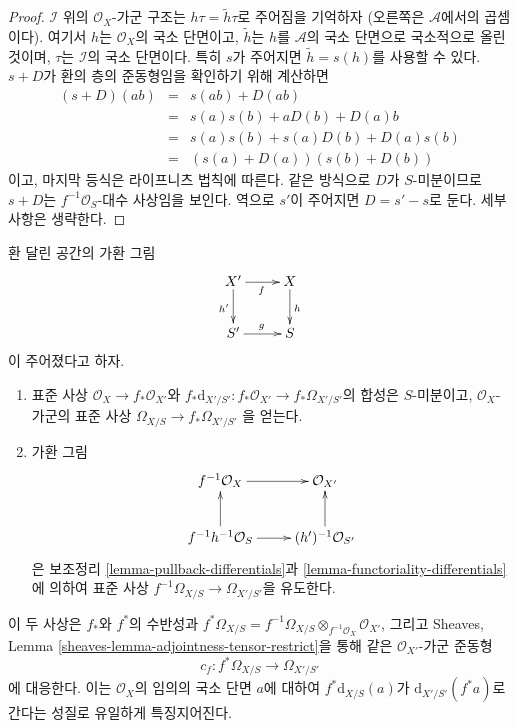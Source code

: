 \begin{proof}
$\mathcal{I}$ 위의 $\mathcal{O}_X$-가군 구조는
$h \tau = \tilde h \tau$로 주어짐을 기억하자
(오른쪽은 $\mathcal{A}$에서의 곱셈이다).
여기서 $h$는 $\mathcal{O}_X$의 국소 단면이고,
$\tilde h$는 $h$를 $\mathcal{A}$의 국소 단면으로 국소적으로
올린 것이며, $\tau$는 $\mathcal{I}$의 국소 단면이다.
특히 $s$가 주어지면 $\tilde h = s(h)$를 사용할 수 있다.
$s + D$가 환의 층의 준동형임을 확인하기 위해 계산하면
\begin{eqnarray*}
(s + D)(ab) & = & s(ab) + D(ab) \\
& = & s(a)s(b) + aD(b) + D(a)b \\
& = & s(a) s(b) + s(a)D(b) + D(a)s(b) \\
& = & (s(a) + D(a))(s(b) + D(b))
\end{eqnarray*}
이고, 마지막 등식은 라이프니츠 법칙에 따른다. 같은 방식으로
$D$가 $S$-미분이므로 $s + D$는 $f^{-1}\mathcal{O}_S$-대수
사상임을 보인다. 역으로 $s'$이 주어지면
$D = s' - s$로 둔다. 세부 사항은 생략한다.
\end{proof}

\begin{lemma}
\label{lemma-functoriality-differentials-ringed-spaces}
환 달린 공간의 가환 그림
$$
\xymatrix{
X' \ar[d]_{h'} \ar[r]_f & X \ar[d]^h \\
S' \ar[r]^g & S
}
$$
이 주어졌다고 하자.
\begin{enumerate}
\item 표준 사상 $\mathcal{O}_X \to f_*\mathcal{O}_{X'}$와
$f_*\text{d}_{X'/S'} : f_*\mathcal{O}_{X'} \to f_*\Omega_{X'/S'}$의
합성은 $S$-미분이고, $\mathcal{O}_X$-가군의 표준 사상
$\Omega_{X/S} \to f_*\Omega_{X'/S'}$
을 얻는다.
\item 가환 그림
$$
\xymatrix{
f^{-1}\mathcal{O}_X \ar[r] & \mathcal{O}_{X'} \\
f^{-1}h^{-1}\mathcal{O}_S \ar[u] \ar[r] & (h')^{-1}\mathcal{O}_{S'} \ar[u]
}
$$
은 보조정리 \ref{lemma-pullback-differentials}과
\ref{lemma-functoriality-differentials}에 의하여 표준 사상
$f^{-1}\Omega_{X/S} \to \Omega_{X'/S'}$을 유도한다.
\end{enumerate}
이 두 사상은 $f_*$와 $f^*$의 수반성과
$f^*\Omega_{X/S} =
f^{-1}\Omega_{X/S} \otimes_{f^{-1}\mathcal{O}_X} \mathcal{O}_{X'}$,
그리고 Sheaves, Lemma \ref{sheaves-lemma-adjointness-tensor-restrict}을
통해 같은 $\mathcal{O}_{X'}$-가군 준동형
$$
c_f : f^*\Omega_{X/S} \longrightarrow \Omega_{X'/S'}
$$
에 대응한다. 이는 $\mathcal{O}_X$의 임의의 국소 단면 $a$에 대하여
$f^*\text{d}_{X/S}(a)$가 $\text{d}_{X'/S'}(f^*a)$로 간다는 성질로
유일하게 특징지어진다.
\end{lemma}


